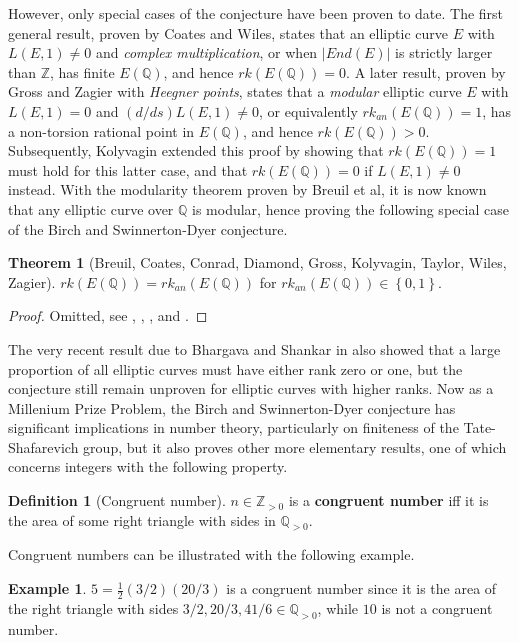 \documentclass{article}
\newcommand{\Z}{\mathbb{Z}}
\newcommand{\Q}{\mathbb{Q}}
\newcommand{\rb}[1]{\left( #1 \right)}
\newcommand{\cb}[1]{\left\{ #1 \right\}}
\newcommand{\abs}[1]{\left\lvert #1 \right\rvert}
\theoremstyle{definition}
\newtheorem*{definition}{Definition}
\newtheorem*{example}{Example}
\newtheorem{theorem}[proposition]{Theorem}
\begin{document}
However, only special cases of the conjecture have been proven to date. The first general result, proven by Coates and Wiles, states that an elliptic curve $ E $ with $ L\rb{E, 1} \ne 0 $ and \emph{complex multiplication}, or when $ \abs{End\rb{E}} $ is strictly larger than $ \Z $, has finite $ E\rb{\Q} $, and hence $ rk\rb{E\rb{\Q}} = 0 $. A later result, proven by Gross and Zagier with \emph{Heegner points}, states that a \emph{modular} elliptic curve $ E $ with $ L\rb{E, 1} = 0 $ and $ \rb{d / ds}L\rb{E, 1} \ne 0 $, or equivalently $ rk_{an}\rb{E\rb{\Q}} = 1 $, has a non-torsion rational point in $ E\rb{\Q} $, and hence $ rk\rb{E\rb{\Q}} > 0 $. Subsequently, Kolyvagin extended this proof by showing that $ rk\rb{E\rb{\Q}} = 1 $ must hold for this latter case, and that $ rk\rb{E\rb{\Q}} = 0 $ if $ L\rb{E, 1} \ne 0 $ instead. With the modularity theorem proven by Breuil et al, it is now known that any elliptic curve over $ \Q $ is modular, hence proving the following special case of the Birch and Swinnerton-Dyer conjecture.

\begin{theorem}[Breuil, Coates, Conrad, Diamond, Gross, Kolyvagin, Taylor, Wiles, Zagier]
$ rk\rb{E\rb{\Q}} = rk_{an}\rb{E\rb{\Q}} $ for $ rk_{an}\rb{E\rb{\Q}} \in \cb{0, 1} $.
\end{theorem}

\begin{proof}
Omitted, see \cite{bsd1}, \cite{bsd2}, \cite{bsd3}, and \cite{modularity}.
\end{proof}

The very recent result due to Bhargava and Shankar in \cite{rankaverage} also showed that a large proportion of all elliptic curves must have either rank zero or one, but the conjecture still remain unproven for elliptic curves with higher ranks. Now as a Millenium Prize Problem, the Birch and Swinnerton-Dyer conjecture has significant implications in number theory, particularly on finiteness of the Tate-Shafarevich group, but it also proves other more elementary results, one of which concerns integers with the following property.

\begin{definition}[Congruent number]
$ n \in \Z_{> 0} $ is a \textbf{congruent number} iff it is the area of some right triangle with sides in $ \Q_{> 0} $.
\end{definition}

Congruent numbers can be illustrated with the following example.

\begin{example}
$ 5 = \tfrac{1}{2}\rb{3 / 2}\rb{20 / 3} $ is a congruent number since it is the area of the right triangle with sides $ 3 / 2, 20 / 3, 41 / 6 \in \Q_{> 0} $, while $ 10 $ is not a congruent number.
\end{example}
\end{document}
